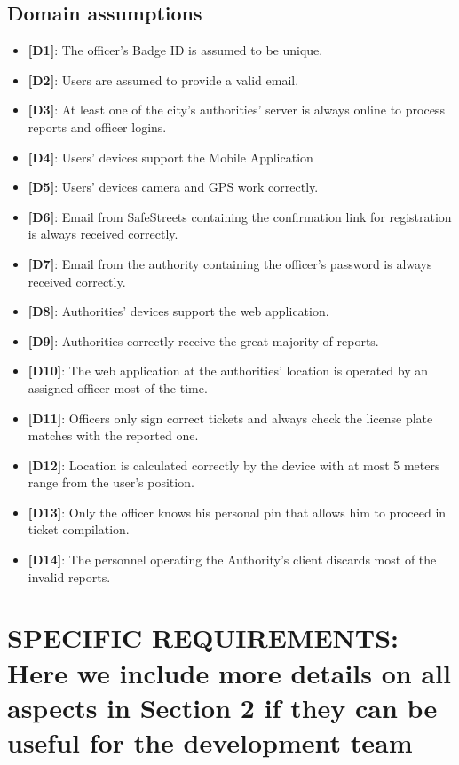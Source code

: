 \documentclass[12pt,a4paper]{article}
\begin{document}
\subsection{Domain assumptions} 
\begin{itemize}
\item {\textbf[}\textbf{D1}{\textbf]}: The officer's Badge ID is assumed to be unique.
\item {\textbf[}\textbf{D2}{\textbf]}: Users are assumed to provide a valid email.
\item {\textbf[}\textbf{D3}{\textbf]}: At least one of the city's authorities' server is always online to process reports and officer logins.
\item {\textbf[}\textbf{D4}{\textbf]}: Users' devices support the Mobile Application 
\item {\textbf[}\textbf{D5}{\textbf]}: Users' devices camera and GPS work correctly.
\item {\textbf[}\textbf{D6}{\textbf]}: Email from SafeStreets containing the confirmation link for registration is always received correctly.
\item {\textbf[}\textbf{D7}{\textbf]}: Email from the authority containing the officer's password is always received correctly.
\item {\textbf[}\textbf{D8}{\textbf]}: Authorities' devices support the web application.
\item {\textbf[}\textbf{D9}{\textbf]}: Authorities correctly receive the great majority of reports.
\item {\textbf[}\textbf{D10}{\textbf]}: The web application at the authorities' location is operated by an assigned officer most of the time.
\item {\textbf[}\textbf{D11}{\textbf]}: Officers only sign correct tickets and always check the license plate matches with the reported one.
\item {\textbf[}\textbf{D12}{\textbf]}: Location is calculated correctly by the device with at most 5 meters range from the user's position.
\item {\textbf[}\textbf{D13}{\textbf]}: Only the officer knows his personal pin that allows him to proceed in ticket compilation.
\item {\textbf[}\textbf{D14}{\textbf]}: The personnel operating the Authority's client discards most of the invalid reports.
\end{itemize}
\section{SPECIFIC	REQUIREMENTS: Here	we	include	more	details	on	all	aspects	in	Section	2	if	they	
can	be	useful	for	the	development	team}
\end{document}
